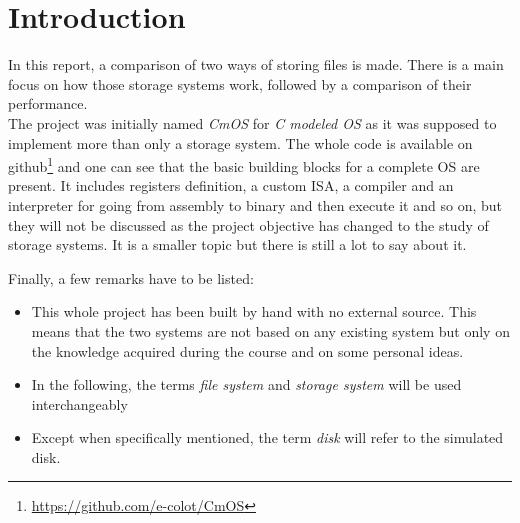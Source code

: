 \documentclass[10pt,a4paper]{ULBreport}
\begin{document}
 





\chapter{Introduction}

In this report, a comparison of two ways of storing files is made. There is a main focus on how those storage systems work, followed by a comparison of their performance. \\

The project was initially named \textit{CmOS} for \textit{C modeled OS} as it was supposed to implement more than only a storage system. The whole code is available on github\footnote{\href{https://github.com/e-colot/CmOS}{https://github.com/e-colot/CmOS}} and one can see that the basic building blocks for a complete OS are present. It includes registers definition, a custom ISA, a compiler and an interpreter for going from assembly to binary and then execute it and so on, but they will not be discussed as the project objective has changed to the study of storage systems. It is a smaller topic but there is still a lot to say about it. 

Finally, a few remarks have to be listed:
\begin{itemize}
    \item This whole project has been built by hand with no external source. This means that the two systems are not based on any existing system but only on the knowledge acquired during the course and on some personal ideas.
    \item In the following, the terms \textit{file system} and \textit{storage system} will be used interchangeably
    \item Except when specifically mentioned, the term \textit{disk} will refer to the simulated disk.
\end{itemize}
\end{document}
